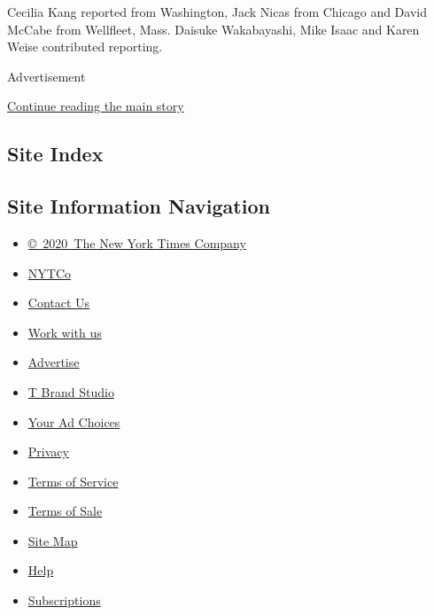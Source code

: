 Cecilia Kang reported from Washington, Jack Nicas from Chicago and David
McCabe from Wellfleet, Mass. Daisuke Wakabayashi, Mike Isaac and Karen
Weise contributed reporting.

Advertisement

\protect\hyperlink{after-bottom}{Continue reading the main story}

\hypertarget{site-index}{%
\subsection{Site Index}\label{site-index}}

\hypertarget{site-information-navigation}{%
\subsection{Site Information
Navigation}\label{site-information-navigation}}

\begin{itemize}
\tightlist
\item
  \href{https://help.nytimes3xbfgragh.onion/hc/en-us/articles/115014792127-Copyright-notice}{©~2020~The
  New York Times Company}
\end{itemize}

\begin{itemize}
\tightlist
\item
  \href{https://www.nytco.com/}{NYTCo}
\item
  \href{https://help.nytimes3xbfgragh.onion/hc/en-us/articles/115015385887-Contact-Us}{Contact
  Us}
\item
  \href{https://www.nytco.com/careers/}{Work with us}
\item
  \href{https://nytmediakit.com/}{Advertise}
\item
  \href{http://www.tbrandstudio.com/}{T Brand Studio}
\item
  \href{https://www.nytimes3xbfgragh.onion/privacy/cookie-policy\#how-do-i-manage-trackers}{Your
  Ad Choices}
\item
  \href{https://www.nytimes3xbfgragh.onion/privacy}{Privacy}
\item
  \href{https://help.nytimes3xbfgragh.onion/hc/en-us/articles/115014893428-Terms-of-service}{Terms
  of Service}
\item
  \href{https://help.nytimes3xbfgragh.onion/hc/en-us/articles/115014893968-Terms-of-sale}{Terms
  of Sale}
\item
  \href{https://spiderbites.nytimes3xbfgragh.onion}{Site Map}
\item
  \href{https://help.nytimes3xbfgragh.onion/hc/en-us}{Help}
\item
  \href{https://www.nytimes3xbfgragh.onion/subscription?campaignId=37WXW}{Subscriptions}
\end{itemize}
